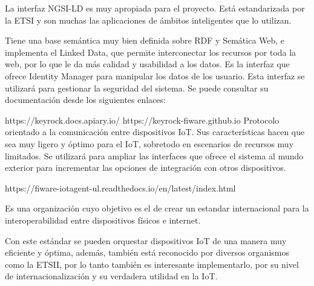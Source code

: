 \documentclass[12pt, a4paper, twoside]{article}
\begin{document}
La interfaz NGSI-LD es muy apropiada para el proyecto. Está estandarizada por la ETSI y
son muchas las aplicaciones de ámbitos inteligentes que lo utilizan.

Tiene una base semántica muy bien definida sobre RDF y Semática Web, e implementa el Linked Data, 
que permite interconectar los recursos por toda la web, por lo que le da más calidad y usabilidad
a los datos.
Es la interfaz que ofrece Identity Manager para manipular los datos de los usuario.
Esta interfaz se utilizará para gestionar la seguridad del sistema.
Se puede consultar su documentación desde los siguientes enlaces: 

https://keyrock.docs.apiary.io/
https://keyrock-fiware.github.io
Protocolo orientado a la comunicación entre dispositivos IoT.
Sus características hacen que sea muy ligero y óptimo para el IoT, sobretodo
en escenarios de recursos muy limitados.
Se utilizará para ampliar las interfaces que ofrece el sistema al mundo exterior
para incrementar las opciones de integración con otros dispositivos.

https://fiware-iotagent-ul.readthedocs.io/en/latest/index.html

Es una organización cuyo objetivo es el de crear un estandar internacional para la interoperabilidad
entre dispositivos físicos e internet.

Con este estándar se pueden orquestar dispositivos IoT de una manera muy eficiente y óptima, además,
también está reconocido por diversos organismos como la ETSII, por lo tanto también es interesante
implementarlo, por su nivel de internacionalización y su verdadera utilidad en la IoT.
\end{document}
